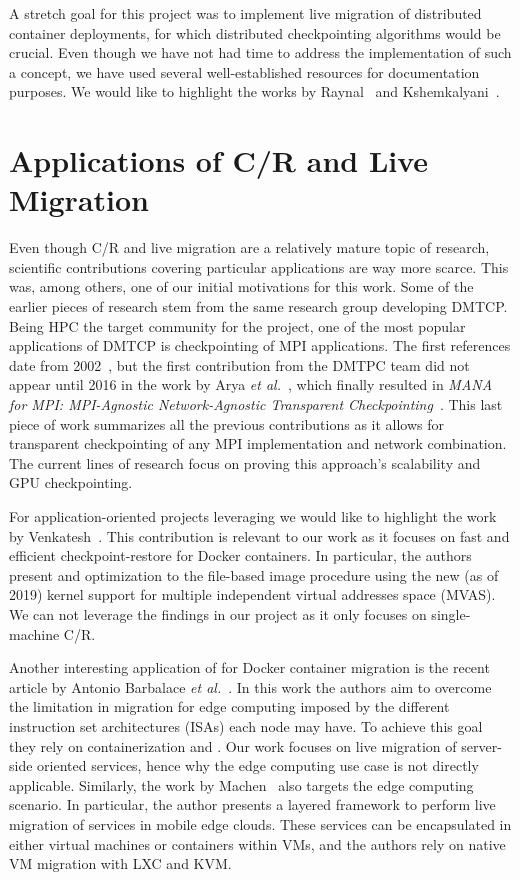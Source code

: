 A stretch goal for this project was to implement live migration of distributed container deployments, for which distributed checkpointing algorithms would be crucial.
Even though we have not had time to address the implementation of such a concept, we have used several well-established resources for documentation purposes.
We would like to highlight the works by Raynal~\cite{Raynal2013} and Kshemkalyani~\cite{Kshemkalyani2008}.

\section{Applications of C/R and Live Migration} \label{sec:rw-app}

Even though C/R and live migration are a relatively mature topic of research, scientific contributions covering particular applications are way more scarce.
This was, among others, one of our initial motivations for this work.
Some of the earlier pieces of research stem from the same research group developing DMTCP.
Being HPC the target community for the project, one of the most popular applications of DMTCP is checkpointing of MPI applications.
The first references date from 2002~\cite{Bosilca2002}, but the first contribution from the DMTPC team did not appear until 2016 in the work by Arya \textit{et al.}~\cite{Arya2016}, which finally resulted in \textit{MANA for MPI: MPI-Agnostic Network-Agnostic Transparent Checkpointing}~\cite{Garg2019}.
This last piece of work summarizes all the previous contributions as it allows for transparent checkpointing of any MPI implementation and network combination.
The current lines of research focus on proving this approach's scalability and GPU checkpointing.

For application-oriented projects leveraging \criu we would like to highlight the work by Venkatesh~\cite{Venkatesh2019}.
This contribution is relevant to our work as it focuses on fast and efficient checkpoint-restore for Docker containers.
In particular, the authors present and optimization to the file-based image procedure using the new (as of 2019) kernel support for multiple independent virtual addresses space (MVAS).
We can not leverage the findings in our project as it only focuses on single-machine C/R.

Another interesting application of \criu for Docker container migration is the recent article by Antonio Barbalace \textit{et al.}~\cite{Barbalace2020}.
In this work the authors aim to overcome the limitation in migration for edge computing imposed by the different instruction set architectures (ISAs) each node may have.
To achieve this goal they rely on containerization and \criu.
Our work focuses on live migration of server-side oriented services, hence why the edge computing use case is not directly applicable.
Similarly, the work by Machen~\cite{Machen2018} also targets the edge computing scenario.
In particular, the author presents a layered framework to perform live migration of services in mobile edge clouds.
These services can be encapsulated in either virtual machines or containers within VMs, and the authors rely on native VM migration with LXC and KVM.

